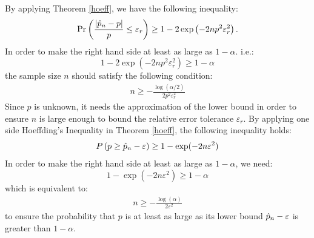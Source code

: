 \documentclass{iitthesis}
\theoremstyle{definition}
\begin{document}

By applying Theorem \ref{hoeff}, we have the following inequality:
\begin{align*}
\Pr\left(\frac{|\hat{p}_n-p|}{p} \leq \varepsilon_r\right) \geq 1-2\exp\left(-2np^2\varepsilon_r^2\right).
\end{align*}
In order to make the right hand side at least as large as $1-\alpha$. i.e.:
$$1-2\exp\left(-2np^2\varepsilon_r^2\right) \geq 1-\alpha$$
the sample size $n$ should satisfy the following condition: 
\begin{align*}
n \geq -\frac{\log (\alpha/2)}{2 p^2 \varepsilon_r^2}
\end{align*}
Since $p$ is unknown, it needs the approximation of the lower bound in order to ensure $n$ is large enough to bound the relative error tolerance $\varepsilon_r$. By applying one side Hoeffding's Inequality in Theorem \ref{hoeff}, the following inequality holds:
\begin{align}\label{onesidehoeffn}
P\left(p \geq \hat{p}_n-\varepsilon \right) \geq 1- \exp(-2n\varepsilon^2)
\end{align}
In order to make the right hand side at least as large as $1-\alpha$, we need:
$$1- \exp(-2n\varepsilon^2) \geq 1-\alpha$$
which is equivalent to: 
\begin{align*}
n \geq -\frac{\log(\alpha)} {2\varepsilon^2 }
 \end{align*}
to ensure the probability that $p$  is at least as large as its lower bound $\hat{p}_n-\varepsilon$ is greater than $1-\alpha$.
\end{document}
